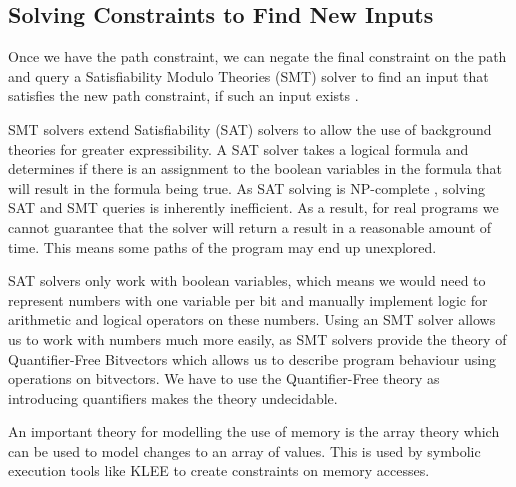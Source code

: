 \documentclass[12pt,twoside]{report}
\begin{document}
\subsection{Solving Constraints to Find New Inputs}
Once we have the path constraint, we can negate the final constraint on the path and query a Satisfiability Modulo Theories (SMT) solver to find an input that satisfies the new path constraint, if such an input exists \cite{Barrett2018}. 

SMT solvers extend Satisfiability (SAT) solvers to allow the use of background theories for greater expressibility. A SAT solver \cite{10.1007/978-3-540-24605-3_37} takes a logical formula and determines if there is an assignment to the boolean variables in the formula that will result in the formula being true. As SAT solving is NP-complete \cite{10.1145/800157.805047}, solving SAT and SMT queries is inherently inefficient. As a result, for real programs we cannot guarantee that the solver will return a result in a reasonable amount of time. This means some paths of the program may end up unexplored.

SAT solvers only work with boolean variables, which means we would need to represent numbers with one variable per bit and manually implement logic for arithmetic and logical operators on these numbers. Using an SMT solver allows us to work with numbers much more easily, as SMT solvers provide the theory of Quantifier-Free Bitvectors which allows us to describe program behaviour using operations on bitvectors. We have to use the Quantifier-Free theory as introducing quantifiers makes the theory undecidable.

An important theory for modelling the use of memory is the array theory \cite{10.1007/978-3-642-00768-2_16} which can be used to model changes to an array of values. This is used by symbolic execution tools like KLEE \cite{cadar2008klee} to create constraints on memory accesses.

\end{document}
